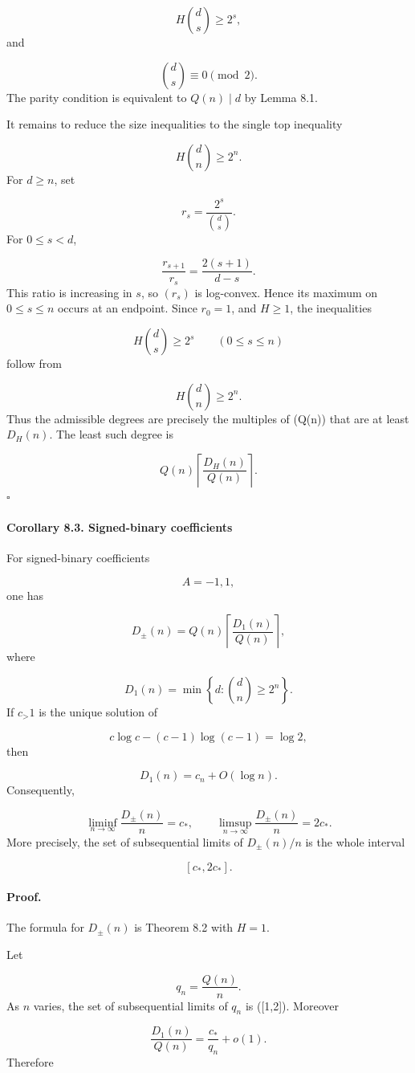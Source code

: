 \documentclass[11pt]{article}
\theoremstyle{definition}
\begin{document}
\[
H\binom ds\ge2^s,
\]
and

\[
\binom ds\equiv0\pmod2.
\]
The parity condition is equivalent to $Q(n)\mid d$ by Lemma 8.1.

It remains to reduce the size inequalities to the single top inequality

\[
H\binom dn\ge2^n.
\]
For $d\ge n$, set

\[
r_s=\frac{2^s}{\binom ds}.
\]
For $0\le s<d$,

\[
\frac{r_{s+1}}{r_s}
=
\frac{2(s+1)}{d-s}.
\]
This ratio is increasing in $s$, so $(r_s)$ is log-convex. Hence its maximum on $0\le s\le n$ occurs at an endpoint. Since $r_0=1$, and $H\ge1$, the inequalities

\[
H\binom ds\ge2^s
\qquad(0\le s\le n)
\]
follow from

\[
H\binom dn\ge2^n.
\]
Thus the admissible degrees are precisely the multiples of (Q(n)) that are at least $D_H(n)$. The least such degree is

\[
Q(n)
\left\lceil
\frac{D_H(n)}{Q(n)}
\right\rceil.
\]
\(\square\)
\paragraph{Corollary 8.3. Signed-binary coefficients}
For signed-binary coefficients

\[
A={-1,1},
\]
one has

\[
D_{\pm}(n)
=
Q(n)
\left\lceil
\frac{D_1(n)}{Q(n)}
\right\rceil,
\]
where

\[
D_1(n)=
\min\left\{d:\binom dn\ge2^n\right\}.
\]
If $c_>1$ is the unique solution of

\[
c\log c-(c-1)\log(c-1)=\log2,
\]
then

\[
D_1(n)=c_n+O(\log n).
\]
Consequently,

\[
\liminf_{n\to\infty}\frac{D_{\pm}(n)}n=c_*,
\qquad
\limsup_{n\to\infty}\frac{D_{\pm}(n)}n=2c_*.
\]
More precisely, the set of subsequential limits of $D_{\pm}(n)/n$ is the whole interval

\[
[c_*,2c_*].
\]
\paragraph{Proof.}
The formula for $D_\pm(n)$ is Theorem 8.2 with $H=1$.

Let

\[
q_n=\frac{Q(n)}n.
\]
As $n$ varies, the set of subsequential limits of $q_n$ is ([1,2]). Moreover

\[
\frac{D_1(n)}{Q(n)}
=
\frac{c_*}{q_n}+o(1).
\]
Therefore
\end{document}
